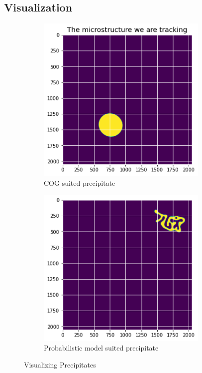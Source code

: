\documentclass[12pt, a4paper]{report}
\begin{document}
\subsection{Visualization}
\begin{figure}[H]
\centering
\begin{subfigure}{.45\textwidth}
  \centering
  \includegraphics[width=0.9\textwidth]{Pictures/Tracking/Traching_cog.jpeg}
  \caption{COG suited precipitate}
  \label{img:microstrImg}
\end{subfigure}
\begin{subfigure}{.45\textwidth}
  \centering
  \includegraphics[width=0.9\textwidth]{Pictures/Tracking/Tracking_choosing_ppt.jpeg}
  \caption{Probabilistic model suited precipitate}
  \label{img:MicrostrImg}
\end{subfigure}
\caption{Visualizing Precipitates}
\label{fig:test}
\end{figure}
\end{document}
